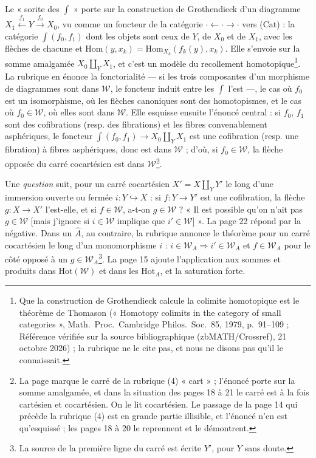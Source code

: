 \documentclass[11pt,a4paper]{article}
\begin{document}
Le « sorite des $\int$ » porte sur la construction de Grothendieck d'un
diagramme $X_{1} \xleftarrow{f_{1}} Y \xrightarrow{f_{0}} X_{0}$, vu comme un
foncteur de la catégorie $\cdot \leftarrow \cdot \rightarrow \cdot$ vers
(Cat) : la catégorie $\int(f_{0}, f_{1})$ dont les objets sont ceux de $Y$, de
$X_{0}$ et de $X_{1}$, avec les flèches de chacune et
$\mathrm{Hom}(y, x_{k}) = \mathrm{Hom}_{X_{k}}(f_{k}(y), x_{k})$. Elle s'envoie
sur la somme amalgamée $X_{0} \amalg_{Y} X_{1}$, et c'est un modèle du
recollement homotopique\footnote{Que la construction de Grothendieck calcule
la colimite homotopique est le théorème de Thomason (« Homotopy colimits in the category of small categories », Math.\ Proc.\ Cambridge Philos.\ Soc.\ 85, 1979, p.~91--109 ; Référence vérifiée sur la source bibliographique (zbMATH/Crossref), 21 octobre 2026) ; la rubrique ne le
cite pas, et nous ne disons pas qu'il le connaissait.}. La rubrique en énonce
la fonctorialité --- si les trois composantes d'un morphisme de diagrammes sont
dans $\mathcal{W}$, le foncteur induit entre les $\int$ l'est ---, le cas où
$f_{0}$ est un isomorphisme, où les flèches canoniques sont des homotopismes,
et le cas où $f_{0} \in \mathcal{W}$, où elles sont dans $\mathcal{W}$. Elle
esquisse ensuite l'énoncé central : si $f_{0}$, $f_{1}$ sont des cofibrations
(resp. des fibrations) et les fibres convenablement asphériques, le foncteur
$\int(f_{0}, f_{1}) \to X_{0} \amalg_{Y} X_{1}$ est une cofibration (resp. une
fibration) à fibres asphériques, donc est dans $\mathcal{W}$ ; d'où, si
$f_{0} \in \mathcal{W}$, la flèche opposée du carré cocartésien est dans
$\mathcal{W}$\footnote{La page marque le carré de la rubrique (4) « cart » ;
l'énoncé porte sur la somme amalgamée, et dans la situation des pages 18 à 21
le carré est à la fois cartésien et cocartésien. On le lit cocartésien. Le
passage de la page 14 qui précède la rubrique (4) est en grande partie
illisible, et l'énoncé n'en est qu'esquissé ; les pages 18 à 20 le reprennent
et le démontrent.}.

Une \emph{question} suit, pour un carré cocartésien
$X' = X \amalg_{Y} Y'$ le long d'une immersion ouverte ou fermée
$i : Y \hookrightarrow X$ : si $f : Y \to Y'$ est une cofibration, la flèche
$g : X \to X'$ l'est-elle, et si $f \in \mathcal{W}$, a-t-on $g \in
\mathcal{W}$ ? « Il est possible qu'on n'ait pas $g \in \mathcal{W}$ [mais
j'ignore si $i \in \mathcal{W}$ implique que $i' \in \mathcal{W}$] ». La page
22 répond par la négative. Dans un $\widehat{A}$, au contraire, la rubrique
annonce le théorème pour un carré cocartésien le long d'un monomorphisme $i$ :
$i \in \mathcal{W}_{A} \Rightarrow i' \in \mathcal{W}_{A}$ et
$f \in \mathcal{W}_{A}$ pour le côté opposé à un $g \in
\mathcal{W}_{A}$\footnote{La source de la première ligne du carré est écrite
$Y'$, pour $Y$ sans doute.}. La page 15 ajoute l'application aux sommes et
produits dans $\mathrm{Hot}(\mathcal{W})$ et dans les $\mathrm{Hot}_{A}$, et
la saturation forte.
\end{document}
